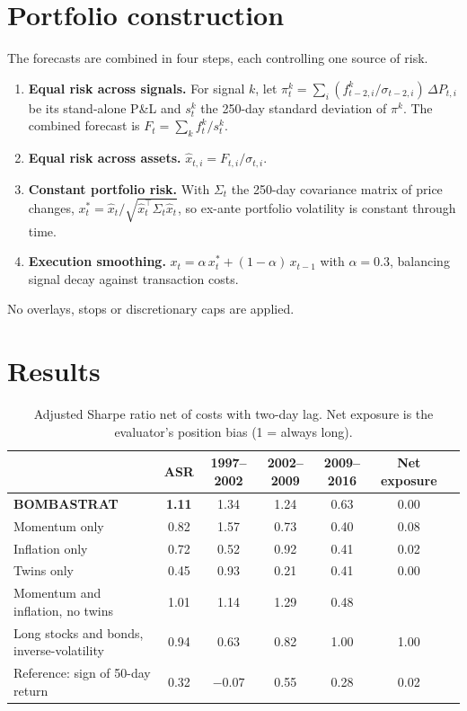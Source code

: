 \documentclass[10.5pt,a4paper]{article}
\begin{document}
\section{Portfolio construction}
The forecasts are combined in four steps, each controlling one source of risk.
\begin{enumerate}
\item \textbf{Equal risk across signals.} For signal $k$, let $\pi^k_t=\sum_i (f^k_{t-2,i}/\sigma_{t-2,i})\,\Delta P_{t,i}$ be its stand-alone P\&L and $s^k_t$ the 250-day standard deviation of $\pi^k$. The combined forecast is $F_t=\sum_k f^k_t/s^k_t$.
\item \textbf{Equal risk across assets.} $\hat x_{t,i}=F_{t,i}/\sigma_{t,i}$.
\item \textbf{Constant portfolio risk.} With $\Sigma_t$ the 250-day covariance matrix of price changes, $x^*_t=\hat x_t\big/\sqrt{\hat x_t^{\top}\Sigma_t\hat x_t}$, so ex-ante portfolio volatility is constant through time.
\item \textbf{Execution smoothing.} $x_t=\alpha\,x^*_t+(1-\alpha)\,x_{t-1}$ with $\alpha=0.3$, balancing signal decay against transaction costs.
\end{enumerate}
No overlays, stops or discretionary caps are applied.

\section{Results}
\begin{table}[h]
\centering\small
\begin{tabular}{lcccccc}
\toprule
 & ASR & 1997--2002 & 2002--2009 & 2009--2016 & Net exposure \\
\midrule
\textbf{BOMBASTRAT} & \textbf{1.11} & 1.34 & 1.24 & 0.63 & 0.00 \\
Momentum only & 0.82 & 1.57 & 0.73 & 0.40 & 0.08 \\
Inflation only & 0.72 & 0.52 & 0.92 & 0.41 & 0.02 \\
Twins only & 0.45 & 0.93 & 0.21 & 0.41 & 0.00 \\
Momentum and inflation, no twins & 1.01 & 1.14 & 1.29 & 0.48 & \\
Long stocks and bonds, inverse-volatility & 0.94 & 0.63 & 0.82 & 1.00 & 1.00 \\
Reference: sign of 50-day return & 0.32 & $-0.07$ & 0.55 & 0.28 & 0.02 \\
\bottomrule
\end{tabular}
\caption{Adjusted Sharpe ratio net of costs with two-day lag. Net exposure is the evaluator's position bias (1 = always long).}
\end{table}
\end{document}

